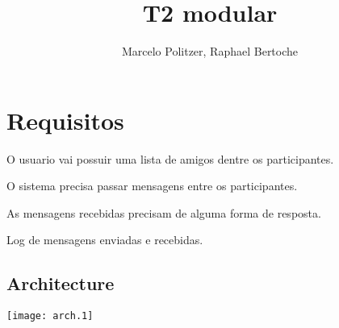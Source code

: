 \documentclass{article}
\title{T2 modular}
\author{Marcelo Politzer, Raphael Bertoche}
\begin{document}
\maketitle

\section{Requisitos}

\begin{list}{*}{}
\item O usuario vai possuir uma lista de amigos dentre os participantes.
\item O sistema precisa passar mensagens entre os participantes.
\item As mensagens recebidas precisam de alguma forma de resposta.
\item Log de mensagens enviadas e recebidas.
\end{list}

\subsection{Architecture}
\texttt{[image: arch.1]}
\end{document}
